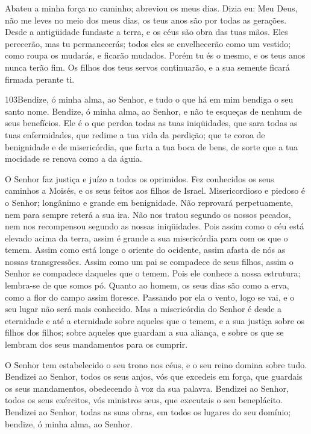 Abateu a minha força no caminho; abreviou os meus dias.
Dizia eu: Meu Deus, não me leves no meio dos meus dias, os
teus anos são por todas as gerações. Desde a antigüidade
fundaste a terra, e os céus são obra das tuas mãos. Eles
perecerão, mas tu permanecerás; todos eles se envelhecerão como um
vestido; como roupa os mudarás, e ficarão mudados. Porém tu
és o mesmo, e os teus anos nunca terão fim. Os filhos dos
teus servos continuarão, e a sua semente ficará firmada perante ti.

\bigskip

\lettrine{103}{}Bendize, ó minha alma, ao Senhor, e tudo o que
há em mim bendiga o seu santo nome. Bendize, ó minha alma, ao
Senhor, e não te esqueças de nenhum de seus benefícios. Ele é o
que perdoa todas as tuas iniqüidades, que sara todas as tuas
enfermidades, que redime a tua vida da perdição; que te coroa de
benignidade e de misericórdia, que farta a tua boca de bens, de
sorte que a tua mocidade se renova como a da águia.

O Senhor faz justiça e juízo a todos os oprimidos. Fez
conhecidos os seus caminhos a Moisés, e os seus feitos aos filhos de
Israel. Misericordioso e piedoso é o Senhor; longânimo e grande
em benignidade. Não reprovará perpetuamente, nem para sempre
reterá a sua ira. Não nos tratou segundo os nossos pecados,
nem nos recompensou segundo as nossas iniqüidades. Pois assim
como o céu está elevado acima da terra, assim é grande a sua
misericórdia para com os que o temem. Assim como está longe o
oriente do ocidente, assim afasta de nós as nossas transgressões.
Assim como um pai se compadece de seus filhos, assim o Senhor
se compadece daqueles que o temem. Pois ele conhece a nossa
estrutura; lembra-se de que somos pó. Quanto ao homem, os
seus dias são como a erva, como a flor do campo assim floresce.
Passando por ela o vento, logo se vai, e o seu lugar não será
mais conhecido. Mas a misericórdia do Senhor é desde a
eternidade e até a eternidade sobre aqueles que o temem, e a sua
justiça sobre os filhos dos filhos; sobre aqueles que guardam
a sua aliança, e sobre os que se lembram dos seus mandamentos para
os cumprir.

O Senhor tem estabelecido o seu trono nos céus, e o seu reino
domina sobre tudo. Bendizei ao Senhor, todos os seus anjos,
vós que excedeis em força, que guardais os seus mandamentos,
obedecendo à voz da sua palavra. Bendizei ao Senhor, todos os
seus exércitos, vós ministros seus, que executais o seu beneplácito.
Bendizei ao Senhor, todas as suas obras, em todos os lugares
do seu domínio; bendize, ó minha alma, ao Senhor.

